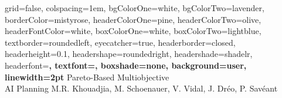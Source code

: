 \documentclass[portrait,a0paper,fontscale=0.277]{baposter}
\begin{document}
\begin{poster}%
  {
  grid=false,
  colspacing=1em,
bgColorOne=white,
bgColorTwo=lavender,
  borderColor=mistyrose,
  headerColorOne=pine,
  headerColorTwo=olive,
  headerFontColor=white,
  boxColorOne=white,
  boxColorTwo=lightblue,
  textborder=roundedleft,
  eyecatcher=true,
  headerborder=closed,
  headerheight=0.1\textheight,
  headershape=roundedright,
  headershade=shadelr,	
	headerfont=\Large\bf, %
  textfont={\color{pinegreen}\setlength{\parindent}{0em}},
	boxshade=none,
	background=user,
  linewidth=2pt
  }
	{
	\makebox[10em]{ }
	}
{\color{purple} Pareto-Based Multiobjective\\ AI Planning\vspace{0.3em}}
{ \color{bloodred} M.R. Khouadjia, M. Schoenauer, V. Vidal, J. Dr\'eo, P. Sav\'eant}
{%

}
\end{poster}
\end{document}
